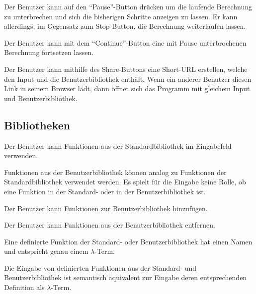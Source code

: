\documentclass[parskip=full,11pt,twoside]{scrartcl}
\begin{document}
Der Benutzer kann auf den \enquote{Pause}-Button drücken um die laufende Berechnung zu unterbrechen und sich die bisherigen Schritte anzeigen zu lassen. Er kann allerdings, im Gegensatz zum Stop-Button, die Berechnung weiterlaufen lassen.

Der Benutzer kann mit dem \enquote{Continue}-Button eine mit Pause unterbrochenen Berechnung fortsetzen lassen.

Der Benutzer kann mithilfe des Share-Buttons eine Short-URL erstellen, welche den Input und die Benutzerbibliothek enthält. Wenn ein anderer Benutzer diesen Link in seinem Browser lädt, dann öffnet sich das Programm mit gleichem Input und Benutzerbibliothek.



\subsection{Bibliotheken}

Der Benutzer kann Funktionen aus der Standardbibliothek im Eingabefeld verwenden.

Funktionen aus der Benutzerbibliothek können analog zu Funktionen der Standardbibliothek verwendet werden. Es spielt für die Eingabe keine Rolle, ob eine Funktion in der Standard- oder in der Benutzerbibliothek ist.

Der Benutzer kann Funktionen zur Benutzerbibliothek hinzufügen.

Der Benutzer kann Funktionen aus der Benutzerbibliothek entfernen.

Eine definierte Funktion der Standard- oder Benutzerbibliothek hat einen Namen und entspricht genau einem $\lambda$-Term.

Die Eingabe von definierten Funktionen aus der Standard- und Benutzerbibliothek ist semantisch äquivalent zur Eingabe deren entsprechenden Definition als $\lambda$-Term.
\end{document}
